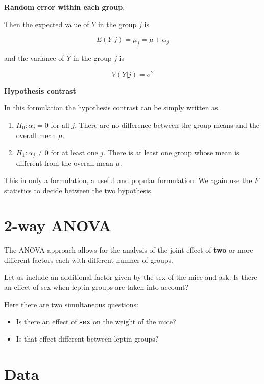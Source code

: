 \documentclass[
]{book}
\begin{document}
\textbf{Random error within each group}:

Then the expected value of \(Y\) in the group \(j\) is

\[E(Y| j)=\mu_j=\mu + \alpha_j\]

and the variance of \(Y\) in the group \(j\) is

\[V(Y| j)=\sigma^2\]

\textbf{Hypothesis contrast}

In this formulation the hypothesis contrast can be simply written as

\begin{enumerate}
\def\labelenumi{\alph{enumi}.}
\item
  \(H_0:\alpha_j=0\) for all \(j\). There are no difference between the group means and the overall mean \(\mu\).
\item
  \(H_1:\alpha_j\neq0\) for at least one \(j\). There is at least one group whose mean is different from the overall mean \(\mu\).
\end{enumerate}

This in only a formulation, a useful and popular formulation. We again use the \(F\) statistics to decide between the two hypothesis.

\hypertarget{way-anova}{%
\section{2-way ANOVA}\label{way-anova}}

The ANOVA approach allows for the analysis of the joint effect of \textbf{two} or more different factors each with different numner of groups.

Let us include an additional factor given by the sex of the mice and ask: Is there an effect of sex when leptin groups are taken into account?

Here there are two simultaneous questions:

\begin{itemize}
\item
  Is there an effect of \textbf{sex} on the weight of the mice?
\item
  Is that effect different between leptin groups?
\end{itemize}

\hypertarget{data-4}{%
\section{Data}\label{data-4}}
\end{document}
